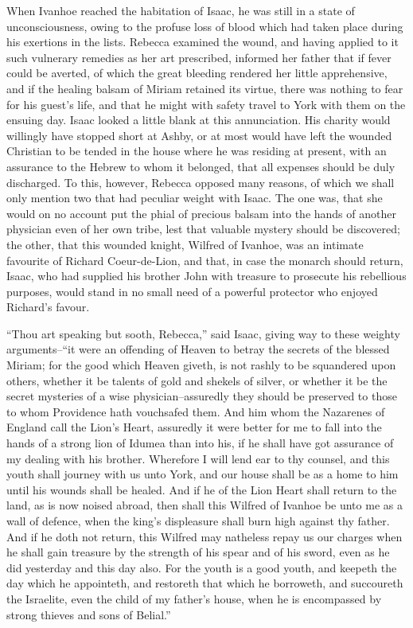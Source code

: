 When Ivanhoe reached the habitation of Isaac, he was still in a state of
unconsciousness, owing to the profuse loss of blood which had taken
place during his exertions in the lists. Rebecca examined the wound, and
having applied to it such vulnerary remedies as her art prescribed,
informed her father that if fever could be averted, of which the great
bleeding rendered her little apprehensive, and if the healing balsam of
Miriam retained its virtue, there was nothing to fear for his guest's
life, and that he might with safety travel to York with them on the
ensuing day. Isaac looked a little blank at this annunciation. His
charity would willingly have stopped short at Ashby, or at most would
have left the wounded Christian to be tended in the house where he was
residing at present, with an assurance to the Hebrew to whom it
belonged, that all expenses should be duly discharged. To this, however,
Rebecca opposed many reasons, of which we shall only mention two that
had peculiar weight with Isaac. The one was, that she would on no
account put the phial of precious balsam into the hands of another
physician even of her own tribe, lest that valuable mystery should be
discovered; the other, that this wounded knight, Wilfred of Ivanhoe, was
an intimate favourite of Richard Coeur-de-Lion, and that, in case the
monarch should return, Isaac, who had supplied his brother John with
treasure to prosecute his rebellious purposes, would stand in no small
need of a powerful protector who enjoyed Richard's favour.

``Thou art speaking but sooth, Rebecca,'' said Isaac, giving way to
these weighty arguments--``it were an offending of Heaven to betray the
secrets of the blessed Miriam; for the good which Heaven giveth, is not
rashly to be squandered upon others, whether it be talents of gold and
shekels of silver, or whether it be the secret mysteries of a wise
physician--assuredly they should be preserved to those to whom
Providence hath vouchsafed them. And him whom the Nazarenes of England
call the Lion's Heart, assuredly it were better for me to fall into the
hands of a strong lion of Idumea than into his, if he shall have got
assurance of my dealing with his brother. Wherefore I will lend ear to
thy counsel, and this youth shall journey with us unto York, and our
house shall be as a home to him until his wounds shall be healed. And if
he of the Lion Heart shall return to the land, as is now noised abroad,
then shall this Wilfred of Ivanhoe be unto me as a wall of defence, when
the king's displeasure shall burn high against thy father. And if he
doth not return, this Wilfred may natheless repay us our charges when he
shall gain treasure by the strength of his spear and of his sword, even
as he did yesterday and this day also. For the youth is a good youth,
and keepeth the day which he appointeth, and restoreth that which he
borroweth, and succoureth the Israelite, even the child of my father's
house, when he is encompassed by strong thieves and sons of Belial.''

